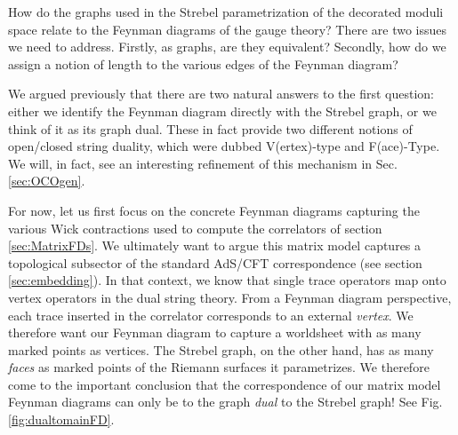 \documentclass[english]{article}
\renewcommand{\>}{\rangle}
\newcommand{\<}{\langle}
\renewcommand{\(}{\left(}
\renewcommand{\)}{\right)}
\begin{document}
How do the graphs used in the Strebel parametrization of the decorated moduli space relate to the Feynman diagrams of the gauge theory? There are two issues we need to address. Firstly, as graphs, are they equivalent? Secondly, how do we assign a notion of length to the various edges of the Feynman diagram?

We argued previously \cite{DSDI} that there are two natural answers to the first question: either we identify the Feynman diagram directly with the Strebel graph, or we think of it as its graph dual. These in fact provide two different notions of open/closed string duality, which were dubbed V(ertex)-type and F(ace)-Type. We will, in fact, see an interesting refinement of this mechanism in Sec. \ref{sec:OCOgen}.

For now, let us first focus on the concrete Feynman diagrams capturing the various Wick contractions used to compute the correlators of section \ref{sec:MatrixFDs}. We ultimately want to argue this matrix model captures a topological subsector of the standard AdS/CFT correspondence (see section \ref{sec:embedding}). In that context, we know that single trace operators map onto vertex operators in the dual string theory. From a Feynman diagram perspective, each trace inserted in the correlator corresponds to an external \textit{vertex}. We therefore want our Feynman diagram to capture a worldsheet with as many marked points as vertices. The Strebel graph, on the other hand, has as many \textit{faces} as marked points of the Riemann surfaces it parametrizes. We therefore come to the important conclusion that the correspondence of our matrix model Feynman diagrams can only be to the graph {\it dual} to the Strebel graph! See Fig. \ref{fig:dualtomainFD}. 
\end{document}
